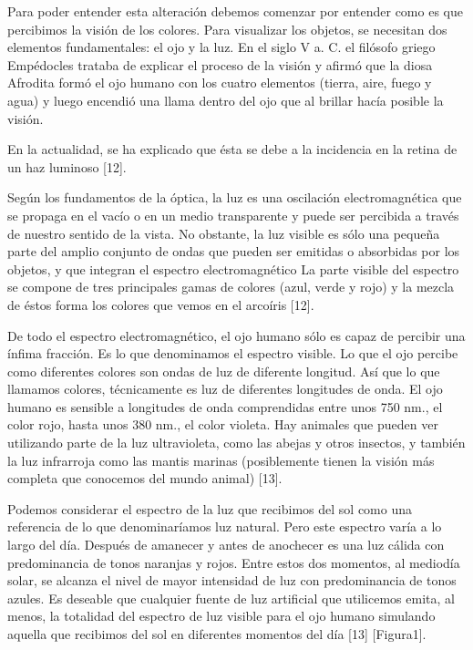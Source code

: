 \documentclass[10pt]{article}
\begin{document}
\setlength{\parskip}{2mm}

Para poder entender esta alteración debemos comenzar por entender como es que percibimos la visión de los colores.
Para visualizar los objetos, se necesitan dos elementos fundamentales: el ojo y la luz. En el siglo V a. C. el filósofo griego Empédocles trataba de explicar el proceso de la visión y afirmó que la diosa Afrodita formó el ojo humano con los cuatro elementos (tierra, aire, fuego y agua) y luego encendió una llama dentro del ojo que al brillar hacía posible la visión.

\setlength{\parskip}{2mm}

En la actualidad, se ha explicado que ésta se debe a la incidencia en la retina de un haz luminoso [12].

\setlength{\parskip}{2mm}

Según los fundamentos de la óptica, la luz es una oscilación electromagnética que se propaga en el vacío o en un medio transparente y puede ser percibida a través de nuestro sentido de la vista. No obstante, la luz visible es sólo una pequeña parte del amplio conjunto de ondas que pueden ser emitidas o absorbidas por los objetos, y que integran el espectro electromagnético La parte visible del espectro se compone de tres principales gamas de colores (azul, verde y rojo) y la mezcla de éstos forma los colores que vemos en el arcoíris [12].

\setlength{\parskip}{2mm}

De todo el espectro electromagnético, el ojo humano sólo es capaz de percibir una ínfima fracción. Es lo que denominamos el espectro visible. Lo que el ojo percibe como diferentes colores son ondas de luz de diferente longitud. Así que lo que llamamos colores, técnicamente es luz de diferentes longitudes de onda. El ojo humano es sensible a longitudes de onda comprendidas entre unos 750 nm., el color rojo, hasta unos 380 nm., el color violeta. Hay animales que pueden ver utilizando parte de la luz ultravioleta, como las abejas y otros insectos, y también la luz infrarroja como las mantis marinas (posiblemente tienen la visión más completa que conocemos del mundo animal) [13].

\setlength{\parskip}{2mm}

Podemos considerar el espectro de la luz que recibimos del sol como una referencia de lo que denominaríamos luz natural. Pero este espectro varía a lo largo del día. Después de amanecer y antes de anochecer es una luz cálida con predominancia de tonos naranjas y rojos. Entre estos dos momentos, al mediodía solar, se alcanza el nivel de mayor intensidad de luz con predominancia de tonos azules. Es deseable que cualquier fuente de luz artificial que utilicemos emita, al menos, la totalidad del espectro de luz visible para el ojo humano simulando aquella que recibimos del sol en diferentes momentos del día [13] [Figura1]. 
\end{document}
